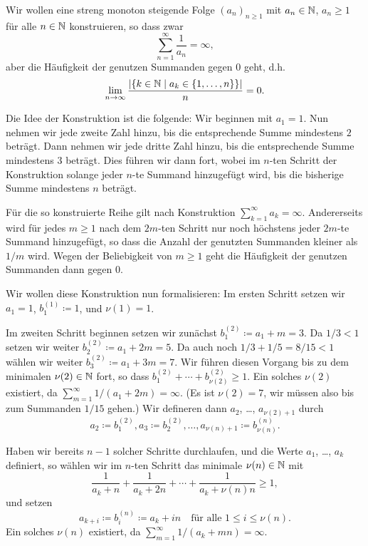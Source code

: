 \documentclass[a4paper,10pt]{article}
\begin{document}
Wir wollen eine streng monoton steigende Folge $(a_n)_{n \geq 1}$ mit $a_n \in \mathbb{N}$, $a_n \geq 1$ für alle $n \in \mathbb{N}$ konstruieren, so dass zwar
\[
 \sum_{n=1}^\infty \frac{1}{a_n} = \infty,
\]
aber die Häufigkeit der genutzen Summanden gegen $0$ geht, d.h.
\begin{equation}\label{eqn: Grenzwert}
 \lim_{n \to \infty} \frac{|\{k \in \mathbb{N} \mid a_k \in \{1, \dotsc, n\}\}|}{n} = 0.
\end{equation}

Die Idee der Konstruktion ist die folgende: Wir beginnen mit $a_1 = 1$. Nun nehmen wir jede zweite Zahl hinzu, bis die entsprechende Summe mindestens $2$ beträgt. Dann nehmen wir jede dritte Zahl hinzu, bis die entsprechende Summe mindestens $3$ beträgt. Dies führen wir dann fort, wobei im $n$-ten Schritt der Konstruktion solange jeder $n$-te Summand hinzugefügt wird, bis die bisherige Summe mindestens $n$ beträgt.

Für die so konstruierte Reihe gilt nach Konstruktion $\sum_{k=1}^\infty a_k = \infty$. Andererseits wird für jedes $m \geq 1$ nach dem $2m$-ten Schritt nur noch höchstens jeder $2m$-te Summand hinzugefügt, so dass die Anzahl der genutzten Summanden kleiner als $1/m$ wird. Wegen der Beliebigkeit von $m \geq 1$ geht die Häufigkeit der genutzen Summanden dann gegen $0$.

Wir wollen diese Konstruktion nun formalisieren: Im ersten Schritt setzen wir $a_1 = 1$, $b^{(1)}_1 \coloneqq 1$, und $\nu(1) = 1$.

Im zweiten Schritt beginnen setzen wir zunächst $b^{(2)}_1 \coloneqq a_1 + m = 3$. Da $1/3 < 1$ setzen wir weiter $b^{(2)}_2 \coloneqq a_1 + 2m = 5$. Da auch noch $1/3 + 1/5 = 8/15 < 1$ wählen wir weiter $b^{(2)}_3 \coloneqq a_1 + 3m = 7$. Wir führen diesen Vorgang bis zu dem minimalen $\nu(2) \in \mathbb{N}$ fort, so dass $b^{(2)}_1 + \dotsb + b^{(2)}_{\nu(2)} \geq 1$. Ein solches $\nu(2)$ existiert, da $\sum_{m=1}^\infty 1/(a_1 + 2m) = \infty$. (Es ist $\nu(2) = 7$, wir müssen also bis zum Summanden $1/15$ gehen.) Wir defineren dann $a_2$, \dots, $a_{\nu(2)+1}$ durch
\[
 a_2 \coloneqq b^{(2)}_1, a_3 \coloneqq b^{(2)}_2, \dotsc, a_{\nu(n)+1} \coloneqq b^{(n)}_{\nu(n)}.
\]

Haben wir bereits $n-1$ solcher Schritte durchlaufen, und die Werte $a_1$, \dots, $a_k$ definiert, so wählen wir im $n$-ten Schritt das minimale $\nu(n) \in \mathbb{N}$ mit
\[
 \frac{1}{a_k + n} + \frac{1}{a_k + 2n} + \dotsb + \frac{1}{a_k + \nu(n) n} \geq 1,
\]
und setzen
\[
 a_{k + i} \coloneqq b^{(n)}_i \coloneqq a_k + in \quad \text{für alle $1 \leq i \leq \nu(n)$}.
\]
Ein solches $\nu(n)$ existiert, da $\sum_{m=1}^\infty 1/(a_k + mn) = \infty$.
\end{document}
